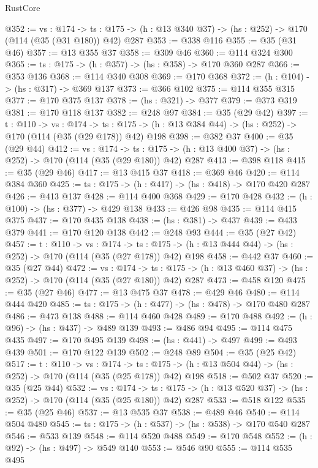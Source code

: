 \begin{lexlean}{RustCore}
\begin{coremodule}
@352 := {vs : @174} ->
  {ts : @175} -> (h : @13 @340 @37) -> (hs : @252) -> @170 (@114 (@35 (@31 @180)) @42) @287
@353 := @338 @116
@355 := @35 (@31 @46)
@357 := @13 @355 @37
@358 := @309 @46
@360 := @114 @324 @300
@365 := {ts : @175} -> (h : @357) -> (hs : @358) -> @170 @360 @287
@366 := @353 @136
@368 := @114 @340 @308
@369 := @170 @368
@372 := (h : @104) -> (hs : @317) -> @369 @137
@373 := @366 @102
@375 := @114 @355 @315
@377 := @170 @375 @137
@378 := (hs : @321) -> @377
@379 := @373 @319
@381 := @170 @118 @137
@382 := @248 @97
@384 := @35 (@29 @42)
@397 := {t : @110} ->
  {vs : @174} ->
  {ts : @175} -> (h : @13 @384 @44) -> (hs : @252) -> @170 (@114 (@35 (@29 @178)) @42) @198
@398 := @382 @37
@400 := @35 (@29 @44)
@412 := {vs : @174} ->
  {ts : @175} -> (h : @13 @400 @37) -> (hs : @252) -> @170 (@114 (@35 (@29 @180)) @42) @287
@413 := @398 @118
@415 := @35 (@29 @46)
@417 := @13 @415 @37
@418 := @369 @46
@420 := @114 @384 @360
@425 := {ts : @175} -> (h : @417) -> (hs : @418) -> @170 @420 @287
@426 := @413 @137
@428 := @114 @400 @368
@429 := @170 @428
@432 := (h : @100) -> (hs : @377) -> @429 @138
@433 := @426 @98
@435 := @114 @415 @375
@437 := @170 @435 @138
@438 := (hs : @381) -> @437
@439 := @433 @379
@441 := @170 @120 @138
@442 := @248 @93
@444 := @35 (@27 @42)
@457 := {t : @110} ->
  {vs : @174} ->
  {ts : @175} -> (h : @13 @444 @44) -> (hs : @252) -> @170 (@114 (@35 (@27 @178)) @42) @198
@458 := @442 @37
@460 := @35 (@27 @44)
@472 := {vs : @174} ->
  {ts : @175} -> (h : @13 @460 @37) -> (hs : @252) -> @170 (@114 (@35 (@27 @180)) @42) @287
@473 := @458 @120
@475 := @35 (@27 @46)
@477 := @13 @475 @37
@478 := @429 @46
@480 := @114 @444 @420
@485 := {ts : @175} -> (h : @477) -> (hs : @478) -> @170 @480 @287
@486 := @473 @138
@488 := @114 @460 @428
@489 := @170 @488
@492 := (h : @96) -> (hs : @437) -> @489 @139
@493 := @486 @94
@495 := @114 @475 @435
@497 := @170 @495 @139
@498 := (hs : @441) -> @497
@499 := @493 @439
@501 := @170 @122 @139
@502 := @248 @89
@504 := @35 (@25 @42)
@517 := {t : @110} ->
  {vs : @174} ->
  {ts : @175} -> (h : @13 @504 @44) -> (hs : @252) -> @170 (@114 (@35 (@25 @178)) @42) @198
@518 := @502 @37
@520 := @35 (@25 @44)
@532 := {vs : @174} ->
  {ts : @175} -> (h : @13 @520 @37) -> (hs : @252) -> @170 (@114 (@35 (@25 @180)) @42) @287
@533 := @518 @122
@535 := @35 (@25 @46)
@537 := @13 @535 @37
@538 := @489 @46
@540 := @114 @504 @480
@545 := {ts : @175} -> (h : @537) -> (hs : @538) -> @170 @540 @287
@546 := @533 @139
@548 := @114 @520 @488
@549 := @170 @548
@552 := (h : @92) -> (hs : @497) -> @549 @140
@553 := @546 @90
@555 := @114 @535 @495

\end{coremodule}
\end{lexlean}
